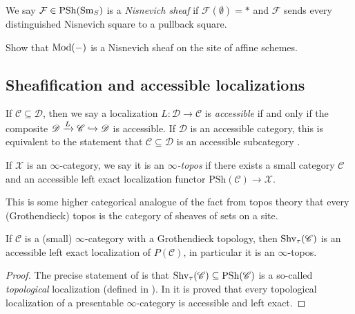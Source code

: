 \documentclass[11pt]{amsart}
\renewcommand{\Pre}{\mathrm{PSh}}
\begin{document}
\begin{definition} We say $\mathcal{F} \in \Pre(\Sm_S)$ is a \textit{Nisnevich sheaf} if $\mathcal{F}(\emptyset)= \ast$ and $\mathcal{F}$ sends every distinguished Nisnevich square to a pullback square.
\end{definition}

\begin{exercise} Show that $\mathrm{Mod}(-)$ is a Nisnevich sheaf on the site of affine schemes.
\end{exercise}



\subsection{Sheafification and accessible localizations}

\begin{definition} If $\mathscr{C} \subseteq \mathscr{D}$, then we say a localization $L \colon \mathscr{D} \to \mathscr{C}$ is \textit{accessible} if and only if the composite $\mathscr{D} \xrightarrow{L} \mathscr{C} \xhookrightarrow{} \mathscr{D}$ is accessible. If $\mathscr{D}$ is an accessible category, this is equivalent to the statement that $\mathscr{C} \subseteq \mathscr{D}$ is an accessible subcategory \cite[5.5.4.2]{HTT}.
\end{definition}



\begin{definition} \cite[6.1.0.4]{HTT} If $\mathscr{X}$ is an $\infty$-category, we say it is an $\infty$\textit{-topos} if there exists a small category $\mathscr{C}$ and an accessible left exact localization functor $\Pre(\mathscr{C}) \to \mathscr{X}$.
\end{definition}

This is some higher categorical analogue of the fact from topos theory that every (Grothendieck) topos is the category of sheaves of sets on a site.


\begin{proposition} \cite[6.2.2.7]{HTT} If $\mathscr{C}$ is a (small) $\infty$-category with a Grothendieck topology,  then $\mathrm{Shv}_\tau(\mathscr{C})$ is an accessible left exact localization of $P(\mathscr{C})$, in particular it is an $\infty$-topos.
\end{proposition}
\begin{proof} The precise statement of \cite[6.2.2.7]{HTT} is that $\Shv_\tau(\mathscr{C}) \subseteq \Pre(\mathscr{C})$ is a so-called \textit{topological} localization (defined in \cite[6.2.1.4]{HTT}). In \cite[6.2.1.6]{HTT} it is proved that every topological localization of a presentable $\infty$-category is accessible and left exact.
\end{proof}
\end{document}
